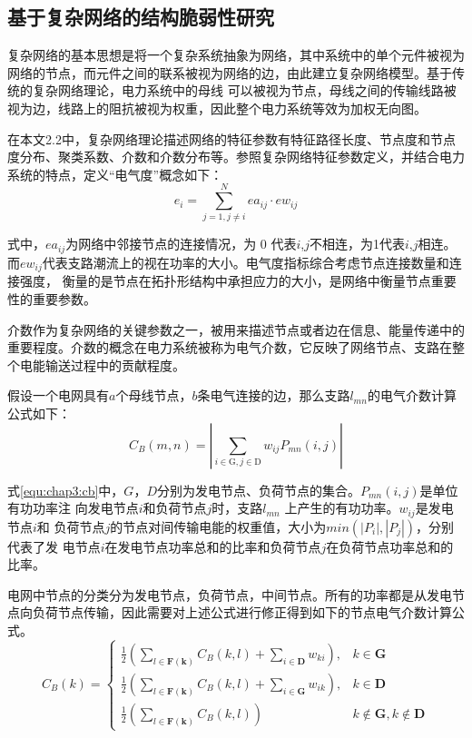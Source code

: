 \subsection{基于复杂网络的结构脆弱性研究}
\label{sec:network}

复杂网络的基本思想是将一个复杂系统抽象为网络，其中系统中的单个元件被视为网络的节点，而元件之间的联系被视为网络的边，由此建立复杂网络模型。基于传统的复杂网络理论，电力系统中的母线
可以被视为节点，母线之间的传输线路被视为边，线路上的阻抗被视为权重，因此整个电力系统等效为加权无向图\cite{refs64,refs65}。

在本文2.2中，复杂网络理论描述网络的特征参数有特征路径长度、节点度和节点度分布、聚类系数、介数和介数分布等。参照复杂网络特征参数定义，并结合电力系统的特点，定义“电气度”概念如下：
\begin{equation}
\label{equ:chap3:index1}
  e_{i}=\sum_{j=1, j \neq i}^{N} e a_{i j} \cdot e w_{i j}
  \end{equation}

式中，$e a_{i j}$为网络中邻接节点的连接情况，为 0 代表$i$,$j$不相连，为1代表$i$,$j$相连。而$ew_{ij}$代表支路潮流上的视在功率的大小。电气度指标综合考虑节点连接数量和连接强度，
衡量的是节点在拓扑形结构中承担应力的大小，是网络中衡量节点重要性的重要参数。

介数作为复杂网络的关键参数之一，被用来描述节点或者边在信息、能量传递中的重要程度。介数的概念在电力系统被称为电气介数，它反映了网络节点、支路在整个电能输送过程中的贡献程度\cite{refs66,refs67}。

假设一个电网具有$a$个母线节点，$b$条电气连接的边，那么支路$l_{mn}$的电气介数计算公式如下：
\begin{equation}
\label{equ:chap3:cb}
  C_{B}(m, n)=\left|\sum_{i \in \mathrm{G}, j \in \mathrm{D}} w_{i j} P_{m n}(i, j)\right|
  \end{equation}

式\ref{equ:chap3:cb}中，$G$，$D$分别为发电节点、负荷节点的集合。$P_{mn} (i, j)$是单位有功功率注
向发电节点$i$和负荷节点$j$时，支路$l_{mn}$ 上产生的有功功率。$w_{ij}$是发电节点$i$和
负荷节点$j$的节点对间传输电能的权重值，大小为$min(|P_i|,|P_j|)$，分别代表了发
电节点$i$在发电节点功率总和的比率和负荷节点$j$在负荷节点功率总和的比率。

电网中节点的分类分为发电节点，负荷节点，中间节点。所有的功率都是从发电节点向负荷节点传输，因此需要对上述公式进行修正得到如下的节点电气介数计算公式。
\begin{equation}
\label{equ:chap3:cb1}
C_{B}(k)=\left\{\begin{array}{ll}{\frac{1}{2}\left(\sum_{l \in \mathbf{F}(\mathbf{k})} C_{B}(k, l)+\sum_{i \in \mathbf{D}} w_{k i}\right),} & {k \in \mathbf{G}} \\ 
{\frac{1}{2}\left(\sum_{l \in \mathbf{F}(\mathbf{k})} C_{B}(k, l)+\sum_{i \in \mathbf{G}} w_{i k}\right),} & {k \in \mathbf{D}} \\
 {\frac{1}{2}\left(\sum_{l \in \mathbf{F}(\mathbf{k})} C_{B}(k, l)\right)} & {k \notin \mathbf{G}, k \notin \mathbf{D}}\end{array}\right.
\end{equation}


